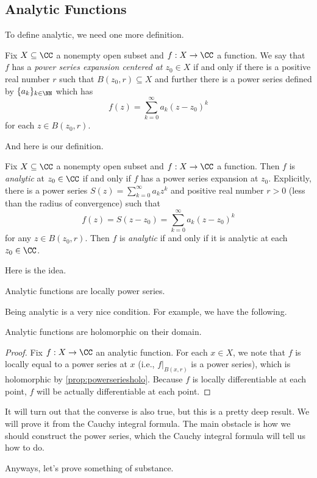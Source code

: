 \subsection{Analytic Functions}
To define analytic, we need one more definition.
\begin{definition}
	Fix $X\subseteq\CC$ a nonempty open subset and $f:X\to\CC$ a function. We say that $f$ has a \textit{power series expansion centered at $z_0\in X$}
	if and only if there is a positive real number $r$ such that $B(z_0,r)\subseteq X$ and further there is a power series defined by
	$\{a_k\}_{k\in\NN}$ which has
	\[f(z)=\sum_{k=0}^\infty a_k(z-z_0)^k\]
	for each $z\in B(z_0,r)$.
\end{definition}
And here is our definition.
\begin{definition}[Analytic]
	Fix $X\subseteq\CC$ a nonempty open subset and $f:X\to\CC$ a function. Then $f$ is \textit{analytic} at $z_0\in\CC$ if and only if $f$ has a power series expansion at $z_0$. Explicitly, there is a power series $S(z)=\sum_{k=0}^\infty a_kz^k$ and positive real number $r>0$ (less than the radius of convergence) such that
	\[f(z)=S(z-z_0)=\sum_{k=0}^\infty a_k(z-z_0)^k\]
	for any $z\in B(z_0,r)$. Then $f$ is \textit{analytic} if and only if it is analytic at each $z_0\in\CC$.
\end{definition}
Here is the idea.
\begin{idea}
	Analytic functions are locally power series.
\end{idea}
Being analytic is a very nice condition. For example, we have the following.
\begin{proposition}
	Analytic functions are holomorphic on their domain.
\end{proposition}
\begin{proof}
	Fix $f:X\to\CC$ an analytic function. For each $x\in X$, we note that $f$ is locally equal to a power series at $x$ (i.e., $f|_{B(x,r)}$ is a power series), which is holomorphic by \autoref{prop:powerseriesholo}. Because $f$ is locally differentiable at each point, $f$ will be actually differentiable at each point.
\end{proof}
\begin{remark}
	It will turn out that the converse is also true, but this is a pretty deep result. We will prove it from the Cauchy integral formula. The main obstacle is how we should construct the power series, which the Cauchy integral formula will tell us how to do.
\end{remark}
Anyways, let's prove something of substance.
